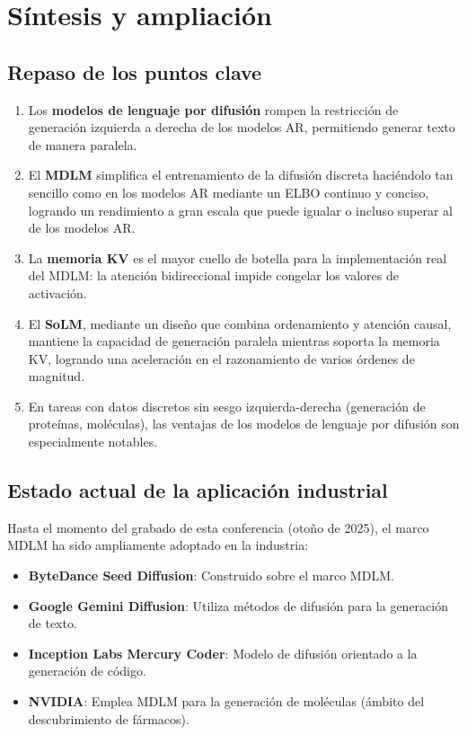 \section{Síntesis y ampliación}

\subsection{Repaso de los puntos clave}

\begin{enumerate}
    \item Los \textbf{modelos de lenguaje por difusión} rompen la restricción de generación izquierda a derecha de los modelos AR, permitiendo generar texto de manera paralela.
    \item El \textbf{MDLM} simplifica el entrenamiento de la difusión discreta haciéndolo tan sencillo como en los modelos AR mediante un ELBO continuo y conciso, logrando un rendimiento a gran escala que puede igualar o incluso superar al de los modelos AR.
    \item La \textbf{memoria KV} es el mayor cuello de botella para la implementación real del MDLM: la atención bidireccional impide congelar los valores de activación.
    \item El \textbf{SoLM}, mediante un diseño que combina ordenamiento y atención causal, mantiene la capacidad de generación paralela mientras soporta la memoria KV, logrando una aceleración en el razonamiento de varios órdenes de magnitud.
    \item En tareas con datos discretos sin sesgo izquierda-derecha (generación de proteínas, moléculas), las ventajas de los modelos de lenguaje por difusión son especialmente notables.
\end{enumerate}

\subsection{Estado actual de la aplicación industrial}

Hasta el momento del grabado de esta conferencia (otoño de 2025), el marco MDLM ha sido ampliamente adoptado en la industria:

\begin{itemize}
    \item \textbf{ByteDance Seed Diffusion}: Construido sobre el marco MDLM.
    \item \textbf{Google Gemini Diffusion}: Utiliza métodos de difusión para la generación de texto.
    \item \textbf{Inception Labs Mercury Coder}: Modelo de difusión orientado a la generación de código.
    \item \textbf{NVIDIA}: Emplea MDLM para la generación de moléculas (ámbito del descubrimiento de fármacos).
\end{itemize}

